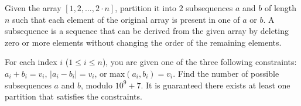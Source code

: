 Given the array $[ 1,2, \ldots ,2 \cdot n ]$, partition it into $2$ subsequences $a$ and $b$ of length $n$ such that each element of the original array is present in one of $a$ or $b$. A subsequence is a sequence that can be derived from the given array by deleting zero or more elements without changing the order of the remaining elements.

For each index $i$ ($ 1 \le i \le n$), you are given one of the three following constraints: $a_i+b_i = v_i$, $|a_i-b_i| = v_i$, or $\text{max}(a_i, b_i) = v_i$. Find the number of possible subsequences $a$ and $b$, modulo $10^9+7$. It is guaranteed there exists at least one partition that satisfies the constraints.
